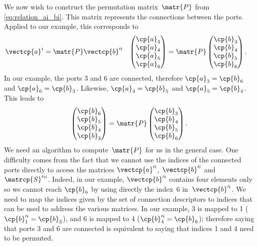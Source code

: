 \begin{refsection}
We now wish to construct the permutation matrix~$\matr{P}$ from \cref{eq:relation_ai_bi}.
This matrix represents the connections between the ports.
Applied to our example, this corresponds to
\begin{align}
    \vectcp{a}^i
    &=
    \matr{P} \vectcp{b}'^i
    &
    \begin{pmatrix}
        \cp{a}_3 \\ \cp{a}_4 \\ \cp{a}_5 \\ \cp{a}_6
    \end{pmatrix}
    &=
    \matr{P}
    \begin{pmatrix}
        \cp{b}_3 \\ \cp{b}_4 \\ \cp{b}_5 \\ \cp{b}_6
    \end{pmatrix}
    \text{.}
    \label{eq:relation_ai_bi_example}
\end{align}
In our example, the ports 3 and 6 are connected,
therefore $\cp{a}_3 = \cp{b}_6$ and $\cp{a}_6 = \cp{b}_3$.
Likewise, $\cp{a}_4=\cp{b}_5$ and $\cp{a}_5=\cp{b}_4$.
This leads to
\begin{equation}
    \begin{pmatrix}
        \cp{b}_6 \\ \cp{b}_5 \\ \cp{b}_4 \\ \cp{b}_3
    \end{pmatrix}
    =
    \matr{P}
    \begin{pmatrix}
        \cp{b}_3 \\ \cp{b}_4 \\ \cp{b}_5 \\ \cp{b}_6
    \end{pmatrix}
    \text{.}
    \label{eq:relation_bi_bi_example}
\end{equation}
We need an algorithm to compute~$\matr{P}$ for us in the general case.
One difficulty comes from the fact that we cannot use the indices of the connected ports directly to access the matrices $\vectcp{a}'^i$, $\vectcp{b}'^i$ and $\matrcp{S}'^{ii}$.
Indeed, in our example, $\vectcp{b}'^i$ contains four elements only so we cannot reach $\cp{b}_6$ by using directly the index~6 in~$\vectcp{b}'^i$.
We need to map the indices given by the set of connection descriptors to indices that can be used to address the various matrices.
In our example, 3 is mapped to 1 ($\cp{b}'^i_1 = \cp{b}_3$), and 6 is mapped to 4 ($\cp{b}'^i_4 = \cp{b}_6$); therefore saying that ports 3 and 6 are connected is equivalent to saying that indices 1 and 4 need to be permuted.

\end{refsection}
